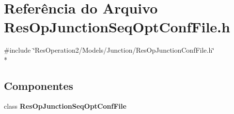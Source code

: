 \section{Referência do Arquivo Res\+Op\+Junction\+Seq\+Opt\+Conf\+File.\+h}
\label{_res_op_junction_seq_opt_conf_file_8h}
{\ttfamily \#include \char`\"{}Res\+Operation2/\+Models/\+Junction/\+Res\+Op\+Junction\+Conf\+File.\+h\char`\"{}}\\*
\subsection*{Componentes}
\begin{DoxyCompactItemize}
\item 
class {\bf Res\+Op\+Junction\+Seq\+Opt\+Conf\+File}
\end{DoxyCompactItemize}
